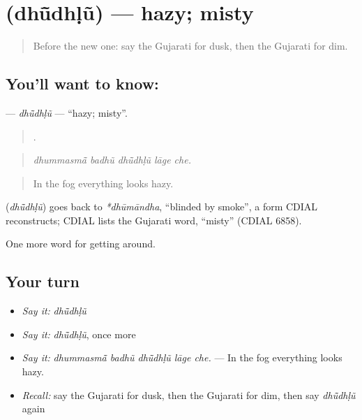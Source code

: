 \section[\texorpdfstring{\gu{ધૂંધળું} (dhū̃dhḷũ)}{ધૂંધળું (dhū̃dhḷũ)}]{ (dhū̃dhḷũ) — hazy; misty}

\label{lesson:GU-C438-dhudhlu}



\begin{quote}
Before the new one: say the Gujarati for dusk, then the Gujarati for dim.
\end{quote}

\subsection*{You'll want to know: }
\textbf{} — \emph{dhū̃dhḷũ} — \textquotedblleft{}hazy; misty\textquotedblright{}.

\begin{quote}
    .
\end{quote}

\begin{quote}
\emph{dhummasmā̃ badhũ dhū̃dhḷũ lāge che.}
\end{quote}

\begin{quote}
In the fog everything looks hazy.
\end{quote}

\begin{cousinweb}
\textbf{} (\emph{dhū̃dhḷũ}) goes back to \emph{*dhūmāndha}, \textquotedblleft{}blinded by smoke\textquotedblright{}, a form CDIAL reconstructs; CDIAL lists the Gujarati word, \textquotedblleft{}misty\textquotedblright{} (CDIAL 6858).
\end{cousinweb}

\begin{grammarlens}[title={What you've built}]
One more word for getting around.
\end{grammarlens}

\subsection*{Your turn}
\begin{itemize}
\raggedright
  \item \emph{Say it:} \emph{dhū̃dhḷũ}
  \item \emph{Say it:} \emph{dhū̃dhḷũ}, once more
  \item \emph{Say it:} \emph{dhummasmā̃ badhũ dhū̃dhḷũ lāge che.} — In the fog everything looks hazy.
  \item \emph{Recall:} say the Gujarati for dusk, then the Gujarati for dim, then say \emph{dhū̃dhḷũ} again
\end{itemize}

